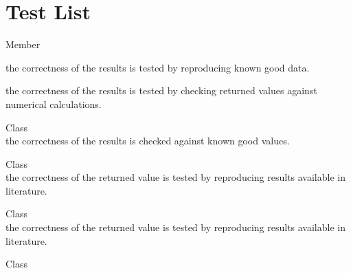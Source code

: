 \chapter{Test List}
\hypertarget{test}{}\label{test}

\begin{DoxyRefList}
\item[Member \doxylink{class_quant_lib_1_1_matrix_a7d1b1a85de60b3f593079112c9a7de80}{pseudo\+Sqrt} ]\hfill \\
\label{test__test000051}%
%

\begin{DoxyItemize}
\item the correctness of the results is tested by reproducing known good data.
\item the correctness of the results is tested by checking returned values against numerical calculations. 
\end{DoxyItemize}
\item[Class \doxylink{class_quant_lib_1_1_actual_actual}{Quant\+Lib\+::Actual\+Actual} ]\hfill \\
\label{test__test000179}%
%
the correctness of the results is checked against known good values.  
\item[Class \doxylink{class_quant_lib_1_1_analytic_american_margrabe_engine}{Quant\+Lib\+::Analytic\+American\+Margrabe\+Engine} ]\hfill \\
\label{test__test000119}%
%
the correctness of the returned value is tested by reproducing results available in literature.  
\item[Class \doxylink{class_quant_lib_1_1_analytic_barrier_engine}{Quant\+Lib\+::Analytic\+Barrier\+Engine} ]\hfill \\
\label{test__test000101}%
%
the correctness of the returned value is tested by reproducing results available in literature.  
\item[Class \doxylink{class_quant_lib_1_1_analytic_binary_barrier_engine}{Quant\+Lib\+::Analytic\+Binary\+Barrier\+Engine} ]\hfill \\
\label{test__test000102}%
%


\end{DoxyRefList}
